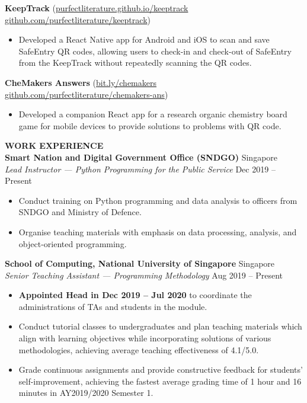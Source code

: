 \documentclass[a4paper, 11pt]{article}
\newcommand{\interspace}{\vspace{7pt}}
\newcommand{\intraspace}{\vspace{2pt}}
\begin{document}
	\intraspace
	
	\textbf{KeepTrack} (\href{https://purfectliterature.github.io/keeptrack/}{purfectliterature.github.io/keeptrack} \textbar\space \href{https://github.com/purfectliterature/keeptrack}{github.com/purfectliterature/keeptrack})
	\begin{itemize}[leftmargin=*, noitemsep, topsep=0pt]
		\item Developed a React Native app for Android and iOS to scan and save SafeEntry QR codes, allowing users to check-in and check-out of SafeEntry from the KeepTrack without repeatedly scanning the QR codes.
	\end{itemize}

	\intraspace
	
	\textbf{CheMakers Answers} (\href{http://bit.ly/chemakers}{bit.ly/chemakers} \textbar\space \href{http://github.com/purfectliterature/chemakers-ans}{github.com/purfectliterature/chemakers-ans})
	\begin{itemize}[leftmargin=*, noitemsep, topsep=0pt]
		\item Developed a companion React app for a research organic chemistry board game for mobile devices to provide solutions to problems with QR code.
	\end{itemize}
	
	\interspace
	
	\textbf{\large WORK EXPERIENCE} \hrulefill \\
	\textbf{Smart Nation and Digital Government Office (SNDGO)} \hfill Singapore\\
	\textit{Lead Instructor --- Python Programming for the Public Service} \hfill Dec 2019 -- Present
	\begin{itemize}[leftmargin=*, noitemsep, topsep=0pt]
		\item Conduct training on Python programming and data analysis to officers from SNDGO and Ministry of Defence.
		\item Organise teaching materials with emphasis on data processing, analysis, and object-oriented programming.
	\end{itemize}

	\intraspace
	
	\textbf{School of Computing, National University of Singapore} \hfill Singapore\\
	\textit{Senior Teaching Assistant --- Programming Methodology} \hfill Aug 2019 -- Present
	\begin{itemize}[leftmargin=*, noitemsep, topsep=0pt]
		\item \textbf{Appointed Head in Dec 2019 -- Jul 2020} to coordinate the administrations of TAs and students in the module.
		\item Conduct tutorial classes to undergraduates and plan teaching materials which align with learning objectives while incorporating solutions of various methodologies, achieving average teaching effectiveness of 4.1/5.0.
		\item Grade continuous assignments and provide constructive feedback for students’ self-improvement, achieving the fastest average grading time of 1 hour and 16 minutes in AY2019/2020 Semester 1.
	\end{itemize}
	
\end{document}
